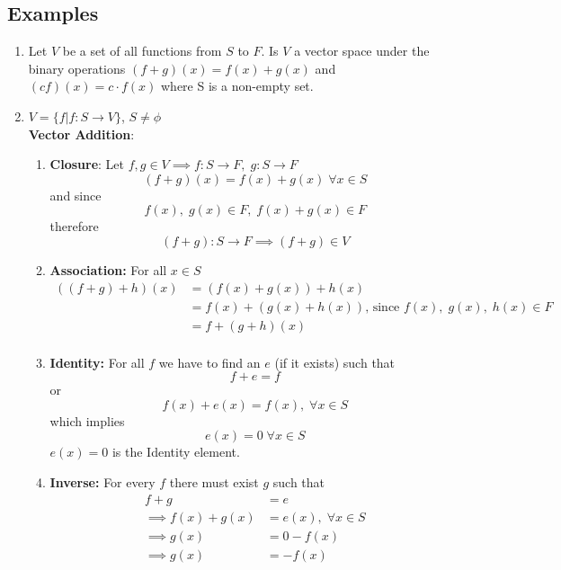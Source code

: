 \documentclass[a4paper, titlepage]{article}
\begin{document}
\subsection{Examples}

\begin{enumerate}[label=\textbf{\arabic*.}]
    \item Let $V$ be a set of all functions from $S$ to $F$. Is $V$ a
    vector space under the binary operations
    $ (f + g)(x) = f(x) + g(x) $ and $ (cf)(x) = c\cdot f(x) $ where S is
    a non-empty set.
    \item[] $ V = \{ f \left. \right\vert f: S \rightarrow V \}$, $S \neq \phi$ \hfill \\ 
    \textbf{Vector Addition}:
    \begin{enumerate}[label=\textbf{\alph*}]
        \item \textbf{Closure}: 
        Let $f, g \in V \implies f: S \rightarrow F,\; g: S \rightarrow F$
        $$(f + g)(x) = f(x) + g(x) \; \forall x \in S$$
        and since 
        $$f(x), \; g(x) \in F, \; f(x) + g(x) \in F$$
        therefore 
        $$(f + g): S \rightarrow F \implies (f+g) \in V$$
        \item \textbf{Association: } For all $x \in S$
        \begin{align*}
            \left( (f + g) + h \right)(x) &= \left( f(x) + g(x) \right) + h(x) \\
                       &= f(x) + \left( g(x) +h(x) \right) \text{, since } f(x), \; g(x), \; h(x) \in F \\ 
                       &= f + (g + h)(x) \\
        \end{align*}
        \item \textbf{Identity: }
        For all $f$ we have to find an $e$ (if it exists) such that
        $$ f + e = f $$
        or
        $$ f(x) + e(x) = f(x), \; \forall x \in S $$
        which implies
        $$ e(x) = 0 \; \forall x \in S $$
        $e(x) = 0$ is the Identity element.
        \item \textbf{Inverse: } For every $f$ there must exist $g$
        such that 
        \begin{align*}
            f + g &= e \\
            \implies f(x) + g(x) &= e(x), \; \forall x \in S \\ 
            \implies g(x) &= 0 - f(x) \\ 
            \implies g(x) &= -f(x) 
        \end{align*}

\end{enumerate}
\end{enumerate}
\end{document}
